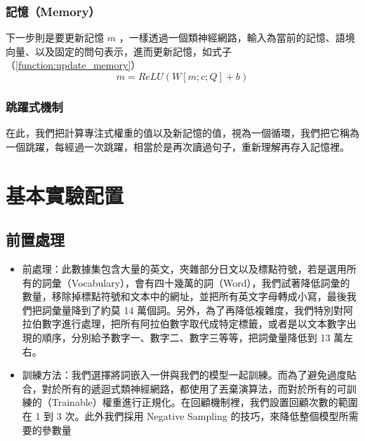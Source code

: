 \subsubsection{記憶（Memory）}
下一步則是要更新記憶 $m$ ，一樣透過一個類神經網路，輸入為當前的記憶、語境向量、以及固定的問句表示，進而更新記憶，如式子（\ref{function:update_memory}）
\begin{equation}
    m = ReLU(W [m; c; Q] +b) \label{function:update_memory}
\end{equation}
\subsubsection{跳躍式機制}
在此，我們把計算專注式權重的值以及新記憶的值，視為一個循環，我們把它稱為一個跳躍，每經過一次跳躍，相當於是再次讀過句子，重新理解再存入記憶裡。
\section{基本實驗配置}
\subsection{前置處理}
\itemsep -4pt
\begin{itemize}
    \item 前處理：此數據集包含大量的英文，夾雜部分日文以及標點符號，若是選用所有的詞彙（Vocabulary），會有四十幾萬的詞（Word），我們試著降低詞彙的數量，移除掉標點符號和文本中的網址，並把所有英文字母轉成小寫，最後我們把詞彙量降到了約莫 14 萬個詞。另外，為了再降低複雜度，我們特別對阿拉伯數字進行處理，把所有阿拉伯數字取代成特定標籤，或者是以文本數字出現的順序，分別給予數字一、數字二、數字三等等，把詞彙量降低到 13 萬左右。
    \item 訓練方法：我們選擇將詞嵌入一併與我們的模型一起訓練。而為了避免過度貼合，對於所有的遞迴式類神經網路，都使用了丟棄演算法，而對於所有的可訓練的（Trainable）權重進行正規化。在回顧機制裡，我們設置回顧次數的範圍在 1 到 3 次。此外我們採用 Negative Sampling 的技巧，來降低整個模型所需要的參數量
\end{itemize}

